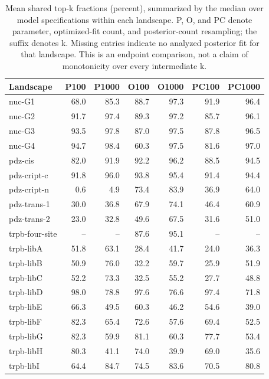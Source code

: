 \begin{table}[p]
\centering
\caption{Mean shared top-k fractions (percent), summarized by the median over model specifications within each landscape. P, O, and PC denote parameter, optimized-fit count, and posterior-count resampling; the suffix denotes k. Missing entries indicate no analyzed posterior fit for that landscape. This is an endpoint comparison, not a claim of monotonicity over every intermediate k.}
\label{tab:landscape-set-sizes}
\begin{tabular}{lrrrrrr}
\toprule
Landscape & P100 & P1000 & O100 & O1000 & PC100 & PC1000 \\
\midrule
nuc-G1 & 68.0 & 85.3 & 88.7 & 97.3 & 91.9 & 96.4 \\
nuc-G2 & 91.7 & 97.4 & 89.3 & 97.2 & 85.7 & 96.1 \\
nuc-G3 & 93.5 & 97.8 & 87.0 & 97.5 & 87.8 & 96.5 \\
nuc-G4 & 94.7 & 98.4 & 60.3 & 97.5 & 81.6 & 97.0 \\
pdz-cis & 82.0 & 91.9 & 92.2 & 96.2 & 88.5 & 94.5 \\
pdz-cript-c & 91.8 & 96.0 & 93.8 & 95.4 & 91.4 & 94.4 \\
pdz-cript-n & 0.6 & 4.9 & 73.4 & 83.9 & 36.9 & 64.0 \\
pdz-trans-1 & 30.0 & 36.8 & 67.9 & 74.1 & 46.4 & 60.9 \\
pdz-trans-2 & 23.0 & 32.8 & 49.6 & 67.5 & 31.6 & 51.0 \\
trpb-four-site & -- & -- & 87.6 & 95.1 & -- & -- \\
trpb-libA & 51.8 & 63.1 & 28.4 & 41.7 & 24.0 & 36.3 \\
trpb-libB & 50.9 & 76.0 & 32.2 & 59.7 & 25.9 & 51.9 \\
trpb-libC & 52.2 & 73.3 & 32.5 & 55.2 & 27.7 & 48.8 \\
trpb-libD & 98.0 & 78.8 & 97.6 & 76.6 & 97.4 & 71.8 \\
trpb-libE & 66.3 & 49.5 & 60.3 & 46.2 & 54.6 & 39.0 \\
trpb-libF & 82.3 & 65.4 & 72.6 & 57.6 & 69.4 & 52.5 \\
trpb-libG & 82.3 & 59.9 & 81.1 & 60.3 & 77.7 & 53.4 \\
trpb-libH & 80.3 & 41.1 & 74.0 & 39.9 & 69.0 & 35.6 \\
trpb-libI & 64.4 & 84.7 & 74.5 & 83.6 & 70.5 & 80.8 \\
\bottomrule
\end{tabular}
\end{table}
